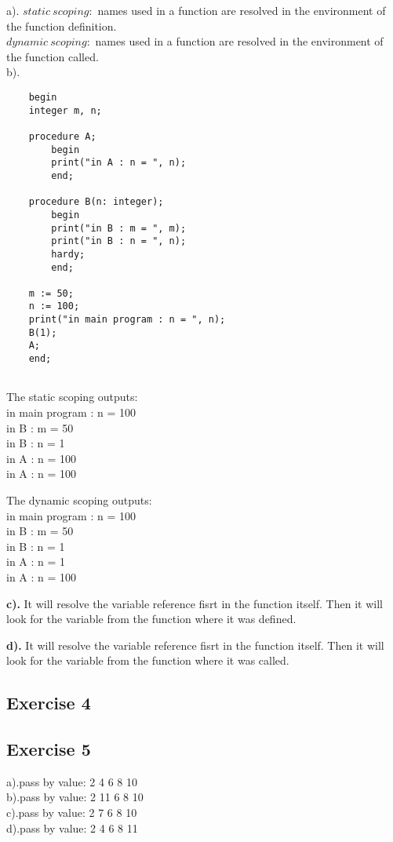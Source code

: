 \documentclass[12pt]{article}
\begin{document}
a). $static\ scoping:$ names used in a function are resolved in the environment of the function definition.
\\[10pt] $dynamic\ scoping:$ names used in a function are resolved in the environment of the function called.
\\[10pt]b).
\begin{lstlisting}
    begin
    integer m, n;

    procedure A;
        begin
        print("in A : n = ", n);
        end;

    procedure B(n: integer);
        begin
        print("in B : m = ", m);
        print("in B : n = ", n);
        hardy;
        end;

    m := 50;
    n := 100;
    print("in main program : n = ", n);
    B(1);
    A;
    end;
    
\end{lstlisting}
The static scoping outputs:
\\[10pt] in main program : n = 100
\\[10pt]in B : m = 50
\\[10pt]in B : n = 1
\\[10pt]in A : n = 100    
\\[10pt]in A : n = 100 

The dynamic scoping outputs:
\\[10pt] in main program : n = 100
\\[10pt]in B : m = 50
\\[10pt]in B : n = 1
\\[10pt]in A : n = 1    
\\[10pt]in A : n = 100

\vspace{1in}
\textbf{c).} It will resolve the variable reference fisrt in the function itself. Then it will look for the variable from the function where it was defined.

\vspace{1in}
\textbf{d).} It will resolve the variable reference fisrt in the function itself. Then it will look for the variable from the function where it was called.

\subsection*{Exercise 4}
\clearpage
\subsection*{Exercise 5}
a).pass by value: 2 4 6 8 10
\\[10pt]b).pass by value: 2 11 6 8 10
\\[10pt]c).pass by value: 2 7 6 8 10
\\[10pt]d).pass by value: 2 4 6 8 11
\end{document}
